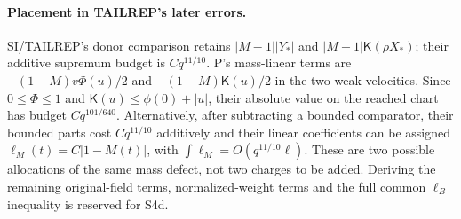 \documentclass[11pt]{article}
\numberwithin{equation}{section}
\theoremstyle{remark}\newtheorem{remark}[theorem]{Remark}
\newcommand{\Kfun}{\mathsf K}
\begin{document}
\paragraph{Placement in TAILREP's later errors.}
SI/TAILREP's donor comparison retains
$|M-1||Y_*|$ and $|M-1|\Kfun(\rho X_*)$; their additive
supremum budget is $Cq^{11/10}$. P's mass-linear terms are
$-(1-M)v\Phi(u)/2$ and $-(1-M)\Kfun(u)/2$ in the two weak
velocities. Since $0\le\Phi\le1$ and
$\Kfun(u)\le\phi(0)+|u|$, their absolute value on the reached
chart has budget $Cq^{101/640}$. Alternatively, after subtracting
a bounded comparator, their bounded parts cost $Cq^{11/10}$
additively and their linear coefficients can be assigned
$\ell_M(t)=C|1-M(t)|$, with
$\int\ell_M=O(q^{11/10}\ell)$.
These are two possible allocations of the same mass defect, not
two charges to be added. Deriving the remaining original-field terms,
normalized-weight terms and the full common $\ell_B$ inequality
is reserved for S4d.
\end{document}

